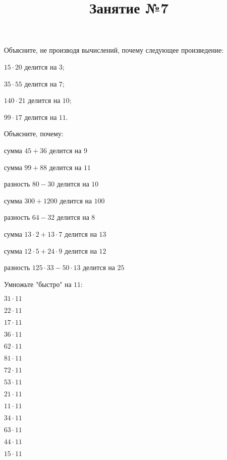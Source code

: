 \newpage
\title{Занятие №7}
\begin{listofex}
	\item Объясните, не производя вычислений, почему следующее произведение:
	\begin{enumcols}[itemcolumns=2]
		\item \( 15\cdot20 \) делится на \( 3 \);
		\item \( 35\cdot55 \) делится на \( 7 \);
		\item \( 140\cdot21 \) делится на \( 10 \);
		\item \( 99\cdot17 \) делится на \( 11 \).
	\end{enumcols}
	\item Объясните, почему:
	\begin{enumcols}[itemcolumns=2]
		\item сумма \( 45+36 \) делится на \( 9 \)
		\item сумма \( 99+88 \) делится на \( 11 \)
		\item разность \( 80-30 \) делится на \( 10 \)
		\item сумма \( 300+1200 \) делится на \( 100 \)
		\item разность \( 64-32 \) делится на \( 8 \)
		\item сумма \( 13\cdot2+13\cdot7\) делится на \( 13 \)
		\item сумма \( 12\cdot5+24\cdot9\) делится на \( 12 \)
		\item разность \( 125\cdot33-50\cdot13\) делится на \( 25 \)
	\end{enumcols}
	\item Умножьте "быстро"{ }на \( 11 \):
	\begin{enumcols}[itemcolumns=5]
		\item \( 31\cdot11 \)
		\item \( 22\cdot11 \)
		\item \( 17\cdot11 \)
		\item \( 36\cdot11 \)
		\item \( 62\cdot11 \)
		\item \( 81\cdot11 \)
		\item \( 72\cdot11 \)
		\item \( 53\cdot11 \)
		\item \( 21\cdot11 \)
		\item \( 11\cdot11 \)
		\item \( 34\cdot11 \)
		\item \( 63\cdot11 \)
		\item \( 44\cdot11 \)
		\item \( 15\cdot11 \)

\end{enumcols}
\end{listofex}

